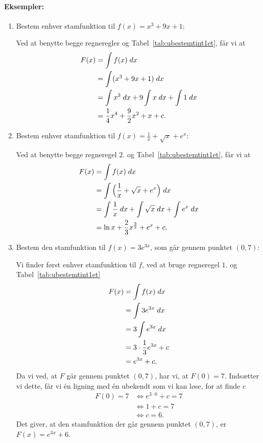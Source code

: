 \paragraph*{Eksempler:}
\begin{enumerate}
\item Bestem enhver stamfunktion til $f(x)=x^3+9x+1$:

Ved at benytte begge regneregler og Tabel~\ref{tab:ubestemtint1et}, får vi at
\begin{align*}
F(x) &=\int f(x) \; d x  \\
&= \int (x^3+9x+1) \; d x \\
&= \int x^3 \; d x + 9 \int x \; d x + \int 1 \; d x  \\
&= \frac{1}{4}x^4 + \frac{9}{2}x^2 + x + c.
\end{align*}
\item Bestem enhver stamfunktion til $f(x)=\frac{1}{x}+\sqrt{x}+e^x$:

Ved at benytte begge regneregel $2.$ og Tabel~\ref{tab:ubestemtint1et}, får vi at
\begin{align*}
F(x) &= \int f(x) \; d x  \\
&= \int \Big(\frac{1}{x}+\sqrt{x}+e^x\Big) \; d x  \\
&= \int \frac{1}{x} \; d x + \int \sqrt{x} \; d x + \int e^x \; d x  \\
&= \ln x + \frac{2}{3}x^{\frac{3}{2}} + e^x +c.
\end{align*}
\item Bestem den stamfunktion til $f(x)=3e^{3x}$, som går gennem punktet $(0,7)$:

Vi finder først enhver stamfunktion til $f$, ved at bruge regneregel $1$. og Tabel~\ref{tab:ubestemtint1et}
\begin{align*}
F(x) &= \int f(x) \; d x \\
&=\int 3e^{3x} \; d x  \\
&= 3 \int e^{3x} \; d x  \\
&=3 \cdot \frac{1}{3} e^{3x} + c \\
&=e^{3x}+c.
\end{align*}
Da vi ved, at $F$ går gennem punktet $(0,7)$, har vi, at $F(0)=7$. Indsætter vi dette, får vi én ligning med én ubekendt som vi kan løse, for at finde $c$
\begin{align*}
F(0)=7 & \Leftrightarrow e^{3 \cdot 0} + c = 7 \\
&\Leftrightarrow 1 + c = 7 \\
&\Leftrightarrow c=6.
\end{align*}
Det giver, at den stamfunktion der går gennem punktet $(0,7)$, er $F(x)=e^{3x}+6$.
\end{enumerate}





